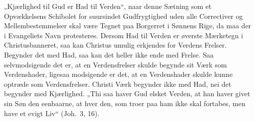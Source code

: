 \documentclass[12pt]{book}
\begin{document}
„Kjærlighed til Gud er Had til Verden“, naar denne Sætning som et
Opvækkelsens Schibolet for suursindet Gudfrygtighed uden alle
Correctiver og Mellembestemmelser skal være Tegnet paa Borgerret i
Sønnens Rige,
da maa der i Evangeliets Navn protesteres. Dersom Had til Verden er
øverste Mærketegn i Christusbanneret, saa kan Christus umulig
erkjendes for Verdens Frelser. Begynder det med Had, saa kan det
heller ikke ende med Frelse. Saa selvmodsigende det er, at en
Verdensfrelser skulde begynde sit Værk som Verdenshader, ligesaa
modsigende er det, at en Verdenshader skulde kunne optræde som
Verdensfrelser. Christi Værk begynder ikke med Had, nei det begynder
med Kjærlighed. „Thi saa haver Gud elsket Verden, at han haver givet
sin Søn den eenbaarne, at hver den, som troer paa ham ikke skal
fortabes, men have et evigt Liv“ (Joh.\ 3, 16).
\end{document}
